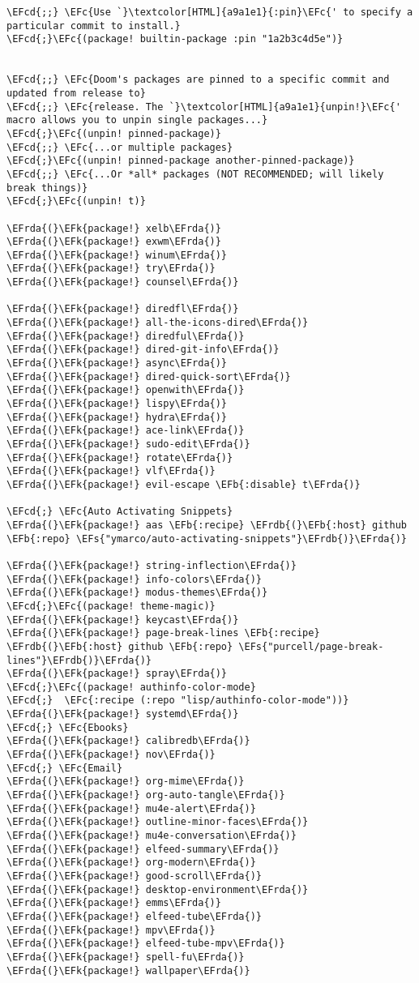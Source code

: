 \documentclass[a4wide,10pt]{article}
\newcommand{\EFc}[1]{\textcolor{EFc}{#1}} %
\newcommand{\EFcd}[1]{\textcolor{EFcd}{#1}} %
\newcommand{\EFs}[1]{\textcolor{EFs}{#1}} %
\newcommand{\EFk}[1]{\textcolor{EFk}{#1}} %
\newcommand{\EFb}[1]{\textcolor{EFb}{#1}} %
\newcommand{\EFrda}[1]{\textcolor{EFrda}{#1}} %
\newcommand{\EFrdb}[1]{\textcolor{EFrdb}{#1}} %
\begin{document}
\begin{Code}
\begin{Verbatim}
\EFcd{;;} \EFc{Use `}\textcolor[HTML]{a9a1e1}{:pin}\EFc{' to specify a particular commit to install.}
\EFcd{;}\EFc{(package! builtin-package :pin "1a2b3c4d5e")}


\EFcd{;;} \EFc{Doom's packages are pinned to a specific commit and updated from release to}
\EFcd{;;} \EFc{release. The `}\textcolor[HTML]{a9a1e1}{unpin!}\EFc{' macro allows you to unpin single packages...}
\EFcd{;}\EFc{(unpin! pinned-package)}
\EFcd{;;} \EFc{...or multiple packages}
\EFcd{;}\EFc{(unpin! pinned-package another-pinned-package)}
\EFcd{;;} \EFc{...Or *all* packages (NOT RECOMMENDED; will likely break things)}
\EFcd{;}\EFc{(unpin! t)}

\EFrda{(}\EFk{package!} xelb\EFrda{)}
\EFrda{(}\EFk{package!} exwm\EFrda{)}
\EFrda{(}\EFk{package!} winum\EFrda{)}
\EFrda{(}\EFk{package!} try\EFrda{)}
\EFrda{(}\EFk{package!} counsel\EFrda{)}

\EFrda{(}\EFk{package!} diredfl\EFrda{)}
\EFrda{(}\EFk{package!} all-the-icons-dired\EFrda{)}
\EFrda{(}\EFk{package!} diredful\EFrda{)}
\EFrda{(}\EFk{package!} dired-git-info\EFrda{)}
\EFrda{(}\EFk{package!} async\EFrda{)}
\EFrda{(}\EFk{package!} dired-quick-sort\EFrda{)}
\EFrda{(}\EFk{package!} openwith\EFrda{)}
\EFrda{(}\EFk{package!} lispy\EFrda{)}
\EFrda{(}\EFk{package!} hydra\EFrda{)}
\EFrda{(}\EFk{package!} ace-link\EFrda{)}
\EFrda{(}\EFk{package!} sudo-edit\EFrda{)}
\EFrda{(}\EFk{package!} rotate\EFrda{)}
\EFrda{(}\EFk{package!} vlf\EFrda{)}
\EFrda{(}\EFk{package!} evil-escape \EFb{:disable} t\EFrda{)}

\EFcd{;} \EFc{Auto Activating Snippets}
\EFrda{(}\EFk{package!} aas \EFb{:recipe} \EFrdb{(}\EFb{:host} github \EFb{:repo} \EFs{"ymarco/auto-activating-snippets"}\EFrdb{)}\EFrda{)}

\EFrda{(}\EFk{package!} string-inflection\EFrda{)}
\EFrda{(}\EFk{package!} info-colors\EFrda{)}
\EFrda{(}\EFk{package!} modus-themes\EFrda{)}
\EFcd{;}\EFc{(package! theme-magic)}
\EFrda{(}\EFk{package!} keycast\EFrda{)}
\EFrda{(}\EFk{package!} page-break-lines \EFb{:recipe} \EFrdb{(}\EFb{:host} github \EFb{:repo} \EFs{"purcell/page-break-lines"}\EFrdb{)}\EFrda{)}
\EFrda{(}\EFk{package!} spray\EFrda{)}
\EFcd{;}\EFc{(package! authinfo-color-mode}
\EFcd{;}  \EFc{:recipe (:repo "lisp/authinfo-color-mode"))}
\EFrda{(}\EFk{package!} systemd\EFrda{)}
\EFcd{;} \EFc{Ebooks}
\EFrda{(}\EFk{package!} calibredb\EFrda{)}
\EFrda{(}\EFk{package!} nov\EFrda{)}
\EFcd{;} \EFc{Email}
\EFrda{(}\EFk{package!} org-mime\EFrda{)}
\EFrda{(}\EFk{package!} org-auto-tangle\EFrda{)}
\EFrda{(}\EFk{package!} mu4e-alert\EFrda{)}
\EFrda{(}\EFk{package!} outline-minor-faces\EFrda{)}
\EFrda{(}\EFk{package!} mu4e-conversation\EFrda{)}
\EFrda{(}\EFk{package!} elfeed-summary\EFrda{)}
\EFrda{(}\EFk{package!} org-modern\EFrda{)}
\EFrda{(}\EFk{package!} good-scroll\EFrda{)}
\EFrda{(}\EFk{package!} desktop-environment\EFrda{)}
\EFrda{(}\EFk{package!} emms\EFrda{)}
\EFrda{(}\EFk{package!} elfeed-tube\EFrda{)}
\EFrda{(}\EFk{package!} mpv\EFrda{)}
\EFrda{(}\EFk{package!} elfeed-tube-mpv\EFrda{)}
\EFrda{(}\EFk{package!} spell-fu\EFrda{)}
\EFrda{(}\EFk{package!} wallpaper\EFrda{)}
\end{Verbatim}
\end{Code}
\end{document}
